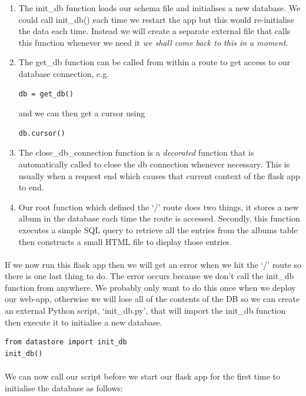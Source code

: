 \documentclass[12pt, a4paper, oneside]{book}
\begin{document}
\begin{enumerate}
\item The init\_db function loads our schema file and initialises a new database. We could call init\_db() each time we restart the app but this would re-initialise the data each time. Instead we will create a separate external file that calls this function whenever we need it \emph{we shall come back to this in a moment}.
\item The get\_db function can be called from within a route to get access to our database connection, e.g.
\begin{lstlisting}[style=DOS]
db = get_db()
\end{lstlisting}
and we can then get a cursor using
\begin{lstlisting}[style=DOS]
db.cursor()
\end{lstlisting}
\item The close\_db\_connection function is a \emph{decorated} function that is automatically called to close the db connection whenever necessary. This is usually when a request end which causes that current context of the flask app to end.
\item Our root function which defined the `/' route does two things, it stores a new album in the database each time the route is accessed. Secondly, this function executes a simple SQL query to retrieve all the entries from the albums table then constructs a small HTML file to display those entries. 
\end{enumerate}

\paragraph{} If we now run this flask app then we will get an error when we hit the `/' route so there is one last thing to do. The error occurs because we don't call the init\_db function from anywhere. We probably only want to do this once when we deploy our web-app, otherwise we will lose all of the contents of the DB so we can create an external Python script, `init\_db.py', that will import the init\_db function then execute it to initialise a new database.

\begin{lstlisting}
from datastore import init_db
init_db()
\end{lstlisting}

\paragraph{} We can now call our script before we start our flask app for the first time to initialise the database as follows:
\end{document}
